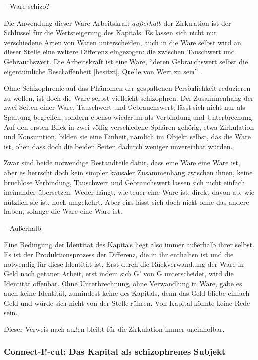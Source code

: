 \documentclass[12pt,
               DIV13,
               paper=a4,
               twoside=false,
               onehalfspacing,
               bibliography=totoc,
               toc=graduated,
               draft,
               ]{scrartcl}
\newcommand{\pc}[2]{\parencite[#1]{#2}}
\begin{document}
-- Ware schizo?

Die Anwendung dieser Ware Arbeitskraft \emph{außerhalb} der
Zirkulation ist der Schlüssel für die Wertsteigerung des Kapitals. Es
lassen sich nicht nur verschiedene Arten von Waren unterscheiden, auch
in die Ware selbst wird an dieser Stelle eine weitere Differenz
eingezogen: die zwischen Tauschwert und Gebrauchswert. Die
Arbeitskraft ist eine Ware, "`deren Gebrauchswert selbst die
eigentümliche Beschaffenheit [besitzt], Quelle von Wert zu sein"'
\pc{181}{kap}.

Ohne Schizophrenie auf das Phänomen der gespaltenen Persönlichkeit
reduzieren zu wollen, ist doch die Ware selbst vielleicht schizophren.
Der Zusammenhang der zwei Seiten einer Ware, Tauschwert und
Gebrauchswert, lässt sich nicht nur als Spaltung begreifen, sondern
ebenso wiederum als Verbindung und Unterbrechung. Auf den ersten Blick
in zwei völlig verschiedene Sphären gehörig, etwa Zirkulation und
Konsumtion, bilden sie eine Einheit, namlich im Objekt selbst, das die
Ware ist, ohen dass doch die beiden Seiten dadurch weniger
unvereinbar würden.

Zwar sind beide notwendige Bestandteile dafür, dass eine Ware eine
Ware ist, aber es herrscht doch kein simpler kausaler Zusammenhang
zwischen ihnen, keine bruchlose Verbindung, Tauschwert und
Gebrauchswert lassen sich nicht einfach ineinander übersetzen. Weder
hängt, wie teuer eine Ware ist, direkt davon ab, wie nützlich sie ist,
noch umgekehrt. Aber eins lässt sich doch nicht ohne das andere haben,
solange die Ware eine Ware ist.

-- Außerhalb

Eine Bedingung der Identität des Kapitals liegt also immer außerhalb
ihrer selbst. Es ist der Produktionsprozess der Differenz, die in ihr
enthalten ist und die notwendig für diese Identität ist. Erst durch
die Rückverwandlung der Ware in Geld nach \glq getaner Arbeit\grq,
erst indem sich G' von G unterscheidet, wird die Identität offenbar.
Ohne Unterbrechnung, ohne Verwandlung in Ware, gäbe es auch keine
Identität, zumindest keine des Kapitals, denn das Geld bliebe einfach
Geld und würde sich nicht von der Stelle rühren. Von Kapital könnte
keine Rede sein.

Dieser Verweis nach außen bleibt für die Zirkulation immer
uneinholbar.



\subsubsection{Connect-I!-cut: Das Kapital als schizophrenes Subjekt}
\end{document}
